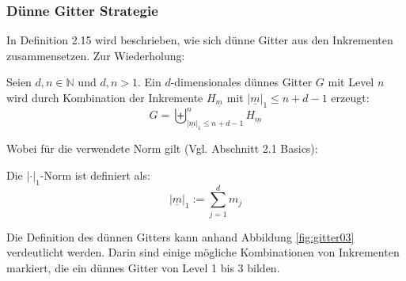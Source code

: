 \documentclass[a4paper,12pt]{llncs}
\numberwithin{equation}{section}
\begin{document}
\subsubsection{Dünne Gitter Strategie}

In \cite{M13} Definition 2.15 wird beschrieben, wie sich dünne Gitter aus den Inkrementen zusammensetzen. Zur Wiederholung:

\begin{definition}
	Seien $d,n\in\mathbb{N}$ und $d,n>1$. Ein $d$-dimensionales dünnes Gitter $G$ mit Level $n$ wird durch Kombination der Inkremente $H_{\underline{m}}$ mit $|\underline{m}|_1\leq n+d-1$ erzeugt:
	\begin{equation}
	G=\biguplus_{|\underline{m}|_1\leq n+d-1}^n H_{\underline{m}}
	\end{equation}
\end{definition}

Wobei für die verwendete Norm gilt (Vgl. \cite{P10} Abschnitt 2.1 Basics):

\begin{definition}
Die  $|\cdot|_1$-Norm ist definiert als:
	\begin{equation}
	|\underline{m}|_1:=\sum_{j=1}^d m_j
	\end{equation}
\end{definition}


Die Definition des dünnen Gitters kann anhand Abbildung \ref{fig:gitter03} verdeutlicht werden. Darin sind einige mögliche Kombinationen von Inkrementen markiert, die ein dünnes Gitter von Level 1 bis 3 bilden.
\end{document}
